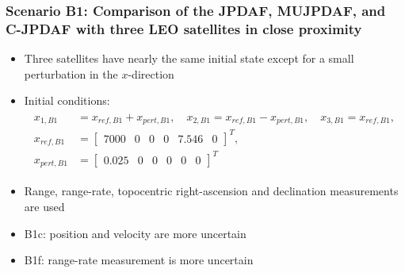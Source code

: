 \documentclass[hyperref={pdftex,pdfpagemode=none,pdfstartview=FitH},10pt]{beamer}
\begin{document}
\begin{frame}
\frametitle{Scenario B1: Comparison of the JPDAF, MUJPDAF, and C-JPDAF with three LEO satellites in close proximity}


\begin{itemize}
\item Three satellites have nearly the same initial state except for a small perturbation in the $x$-direction
\item Initial conditions:
\begin{align}
\begin{split}
x_{1,B1}&=x_{ref,B1}+x_{pert,B1}, \quad x_{2,B1}=x_{ref,B1}-x_{pert,B1}, \quad x_{3,B1}=x_{ref,B1},
\\
x_{ref,B1}&=\begin{bmatrix}7000 & 0 & 0 & 0 & 7.546 & 0\end{bmatrix}^T,\nonumber
\\
x_{pert,B1}&=\begin{bmatrix}
0.025 & 0 & 0 & 0 & 0 & 0
\end{bmatrix}^T\nonumber
\end{split}
\end{align}
\item Range, range-rate, topocentric right-ascension and declination measurements are used
\item B1c: position and velocity are more uncertain
\item B1f: range-rate measurement is more uncertain
\end{itemize}


\end{frame}
\end{document}
